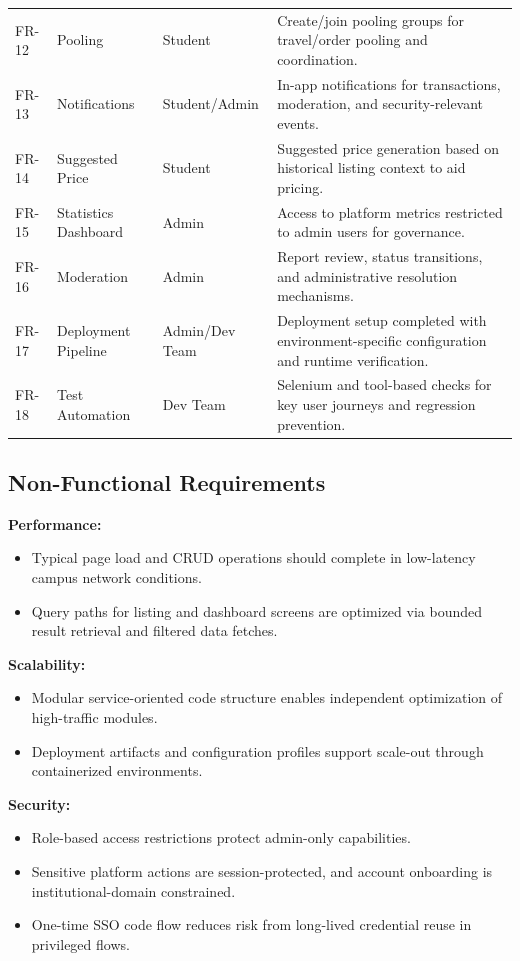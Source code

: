 \documentclass[12pt,a4paper]{article}
\begin{document}
\begin{longtable}{p{} p{} p{} p{}}
FR-12 & Pooling & Student & Create/join pooling groups for travel/order pooling and coordination. \\
FR-13 & Notifications & Student/Admin & In-app notifications for transactions, moderation, and security-relevant events. \\
FR-14 & Suggested Price & Student & Suggested price generation based on historical listing context to aid pricing. \\
FR-15 & Statistics Dashboard & Admin & Access to platform metrics restricted to admin users for governance. \\
FR-16 & Moderation & Admin & Report review, status transitions, and administrative resolution mechanisms. \\
FR-17 & Deployment Pipeline & Admin/Dev Team & Deployment setup completed with environment-specific configuration and runtime verification. \\
FR-18 & Test Automation & Dev Team & Selenium and tool-based checks for key user journeys and regression prevention. \\
\bottomrule
\end{longtable}

\subsection{Non-Functional Requirements}
\textbf{Performance:}
\begin{itemize}[leftmargin=*]
    \item Typical page load and CRUD operations should complete in low-latency campus network conditions.
    \item Query paths for listing and dashboard screens are optimized via bounded result retrieval and filtered data fetches.
\end{itemize}

\textbf{Scalability:}
\begin{itemize}[leftmargin=*]
    \item Modular service-oriented code structure enables independent optimization of high-traffic modules.
    \item Deployment artifacts and configuration profiles support scale-out through containerized environments.
\end{itemize}

\textbf{Security:}
\begin{itemize}[leftmargin=*]
    \item Role-based access restrictions protect admin-only capabilities.
    \item Sensitive platform actions are session-protected, and account onboarding is institutional-domain constrained.
    \item One-time SSO code flow reduces risk from long-lived credential reuse in privileged flows.
\end{itemize}
\end{document}
